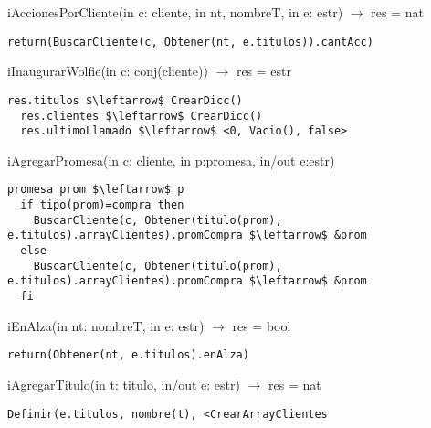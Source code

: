 iAccionesPorCliente(in c: cliente, in nt, nombreT, in e: estr) $\rightarrow$ res = nat
\begin{lstlisting}[mathescape]
  return(BuscarCliente(c, Obtener(nt, e.titulos)).cantAcc)
\end{lstlisting}

iInaugurarWolfie(in c: conj(cliente)) $\rightarrow$ res = estr
\begin{lstlisting}[mathescape]
  res.titulos $\leftarrow$ CrearDicc()
  res.clientes $\leftarrow$ CrearDicc()
  res.ultimoLlamado $\leftarrow$ <0, Vacio(), false>
\end{lstlisting}

iAgregarPromesa(in c: cliente, in p:promesa, in/out e:estr)
\begin{lstlisting}[mathescape]
  promesa prom $\leftarrow$ p
  if tipo(prom)=compra then
  	BuscarCliente(c, Obtener(titulo(prom), e.titulos).arrayClientes).promCompra $\leftarrow$ &prom
  else
  	BuscarCliente(c, Obtener(titulo(prom), e.titulos).arrayClientes).promCompra $\leftarrow$ &prom
  fi
\end{lstlisting}

iEnAlza(in nt: nombreT, in e: estr) $\rightarrow$ res = bool
\begin{lstlisting}[mathescape]
  return(Obtener(nt, e.titulos).enAlza)
\end{lstlisting}

iAgregarTitulo(in t: titulo, in/out e: estr) $\rightarrow$ res = nat
\begin{lstlisting}[mathescape]
  Definir(e.titulos, nombre(t), <CrearArrayClientes
\end{lstlisting}
